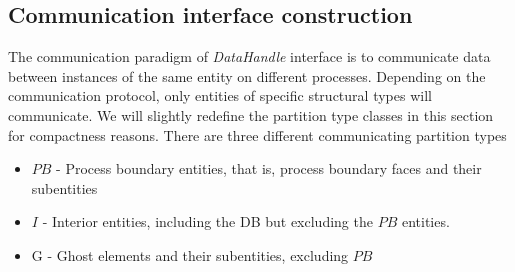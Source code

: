 \subsection{Communication interface construction}
\label{impl-grid-constructor-comm}

The communication paradigm of \dune{} \textit{DataHandle} interface is to communicate data between instances of the same entity on different processes. Depending on the communication protocol, only entities of specific structural types will communicate. We will slightly redefine the partition type classes in this section for compactness reasons. There are three different communicating partition types
\begin{itemize}
	\item $PB$ - Process boundary entities, that is, process boundary faces and their subentities
	\item $I$ - Interior entities, including the DB but excluding the $PB$ entities.
	\item G - Ghost elements and their subentities, excluding $PB$
\end{itemize}


